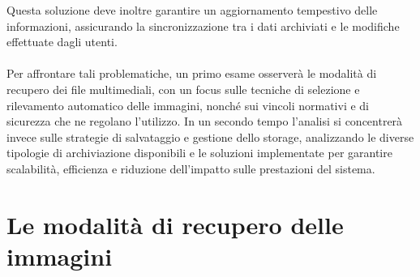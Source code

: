Questa soluzione deve inoltre garantire un aggiornamento tempestivo delle informazioni, 
assicurando la sincronizzazione tra i dati archiviati e le modifiche effettuate dagli utenti.\\
\\
Per affrontare tali problematiche, 
un primo esame osserverà le modalità di recupero dei file multimediali,
con un focus sulle tecniche di selezione e rilevamento automatico delle immagini, 
nonché sui vincoli normativi e di sicurezza che ne regolano l’utilizzo.
In un secondo tempo l’analisi si concentrerà invece 
sulle strategie di salvataggio e gestione dello storage,
analizzando le diverse tipologie di archiviazione disponibili e le soluzioni implementate 
per garantire scalabilità, efficienza e riduzione dell’impatto sulle prestazioni del sistema.\\

\section{Le modalità di recupero delle immagini }

